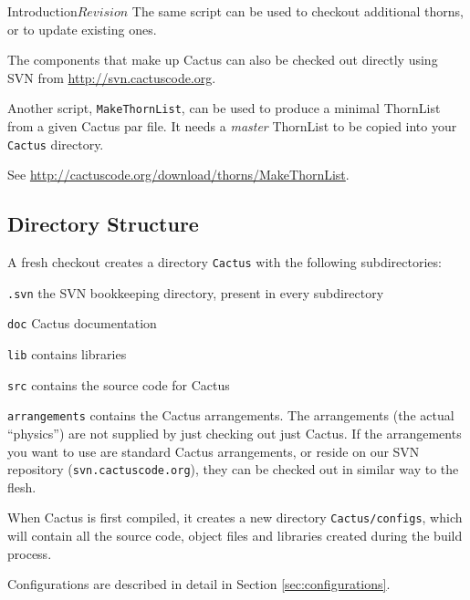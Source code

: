 \begin{cactuspart}{Introduction}{}{$Revision$}
The same script can be used to checkout additional thorns, or to update 
existing ones.

The components that make up Cactus can also be checked out directly
using SVN from \url{http://svn.cactuscode.org}.

Another script, \texttt{MakeThornList}, can be used to produce a minimal
ThornList from a given Cactus par file.  It needs a \emph{master} ThornList
to be copied into your \texttt{Cactus} directory.

See \url{http://cactuscode.org/download/thorns/MakeThornList}.



\subsection{Directory Structure}
\label{sec:dist}

A fresh checkout creates a directory \texttt{Cactus} with the
following subdirectories:

\begin{Lentry}

\item[\texttt{.svn}] the SVN bookkeeping directory, present in every subdirectory

\item[\texttt{doc}] Cactus documentation

\item[\texttt{lib}] contains libraries

\item[\texttt{src}] contains the source code for Cactus

\item [\texttt{arrangements}] contains the Cactus arrangements. The arrangements
  (the actual ``physics'') are not supplied by just checking out just Cactus.
  If the arrangements you want to use are standard Cactus arrangements, or
  reside on our SVN repository (\texttt{svn.cactuscode.org}),
  they can be checked out in similar way to the flesh.
\end{Lentry}

When Cactus is first compiled, it creates a new directory
\texttt{Cactus/configs}, which will contain all the source code, object files
and libraries created during the build process.

Configurations are described in detail in Section \ref{sec:configurations}.



\end{cactuspart}
